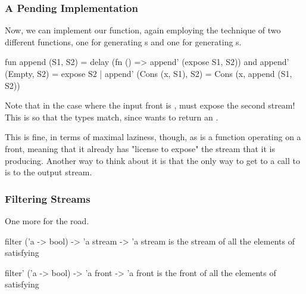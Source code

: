\documentclass[aspectratio=169, handout]{beamer}
\begin{document}
\begin{frame}[fragile]
  \frametitle{A Pending Implementation}

  Now, we can implement our function, again employing the technique of
  two different functions, one for generating s and one for
  generating s.

  \pause
  \vspace{\fill}

  \begin{codeblock}
    fun append  (S1, S2) =
      delay (fn () => append' (expose S1, S2))
    and append' (Empty, S2) = expose S2
      | append' (Cons (x, S1), S2) = Cons (x, append (S1, S2))
  \end{codeblock}

  \pause
  \vspace{\fill}

  Note that in the case where the input front is , 
  must expose the second stream! This is so that the types match, since 
  wants to return an .

  \pause
  \vspace{\fill}

  This is fine, in terms of maximal laziness, though, as  is a
  function operating on a front, meaning that it already has "license to expose"
  the stream that it is producing. Another way to think about it is that
  the only way to get to a call to  is to  the
  output stream.
\end{frame}

\begin{frame}[fragile]
  \frametitle{Filtering Streams}

  One more for the road.

  \pause
  \vspace{\fill}

  \spec
    {filter}
    {('a -> bool) -> 'a stream -> 'a stream}
    {}
    { is the stream of all the elements of  satisfying }

  \vspace{\fill}

  \spec
    {filter'}
    {('a -> bool) -> 'a front -> 'a front}
    {}
    { is the front of all the elements of  satisfying }
\end{frame}
\end{document}
